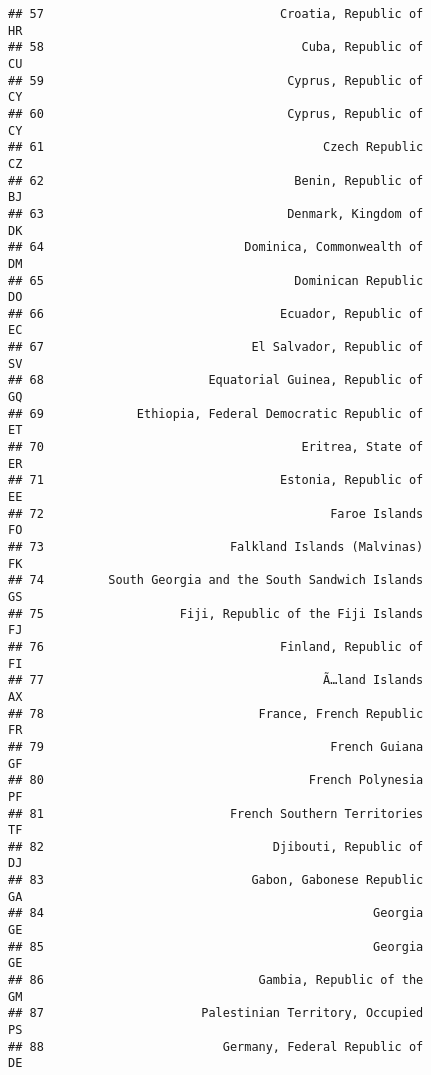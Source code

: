 \documentclass[
]{article}
\begin{document}
\begin{verbatim}
## 57                                 Croatia, Republic of                      HR
## 58                                    Cuba, Republic of                      CU
## 59                                  Cyprus, Republic of                      CY
## 60                                  Cyprus, Republic of                      CY
## 61                                       Czech Republic                      CZ
## 62                                   Benin, Republic of                      BJ
## 63                                  Denmark, Kingdom of                      DK
## 64                            Dominica, Commonwealth of                      DM
## 65                                   Dominican Republic                      DO
## 66                                 Ecuador, Republic of                      EC
## 67                             El Salvador, Republic of                      SV
## 68                       Equatorial Guinea, Republic of                      GQ
## 69             Ethiopia, Federal Democratic Republic of                      ET
## 70                                    Eritrea, State of                      ER
## 71                                 Estonia, Republic of                      EE
## 72                                        Faroe Islands                      FO
## 73                          Falkland Islands (Malvinas)                      FK
## 74         South Georgia and the South Sandwich Islands                      GS
## 75                   Fiji, Republic of the Fiji Islands                      FJ
## 76                                 Finland, Republic of                      FI
## 77                                       Ã…land Islands                      AX
## 78                              France, French Republic                      FR
## 79                                        French Guiana                      GF
## 80                                     French Polynesia                      PF
## 81                          French Southern Territories                      TF
## 82                                Djibouti, Republic of                      DJ
## 83                             Gabon, Gabonese Republic                      GA
## 84                                              Georgia                      GE
## 85                                              Georgia                      GE
## 86                              Gambia, Republic of the                      GM
## 87                      Palestinian Territory, Occupied                      PS
## 88                         Germany, Federal Republic of                      DE

\end{verbatim}
\end{document}
